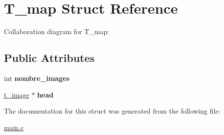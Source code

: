 \hypertarget{structT__map}{}\section{T\+\_\+map Struct Reference}
\label{structT__map}


Collaboration diagram for T\+\_\+map\+:
\subsection*{Public Attributes}
\begin{DoxyCompactItemize}
\item 
int {\bfseries nombre\+\_\+images}\hypertarget{structT__map_a85bbcb24ec17917d93f2c3d0dca0db35}{}\label{structT__map_a85bbcb24ec17917d93f2c3d0dca0db35}

\item 
\hyperlink{structt__image}{t\+\_\+image} $\ast$ {\bfseries head}\hypertarget{structT__map_a59dbe5a095b65d5f9cd8355774b97364}{}\label{structT__map_a59dbe5a095b65d5f9cd8355774b97364}

\end{DoxyCompactItemize}


The documentation for this struct was generated from the following file\+:\begin{DoxyCompactItemize}
\item 
\hyperlink{main_8c}{main.\+c}\end{DoxyCompactItemize}
